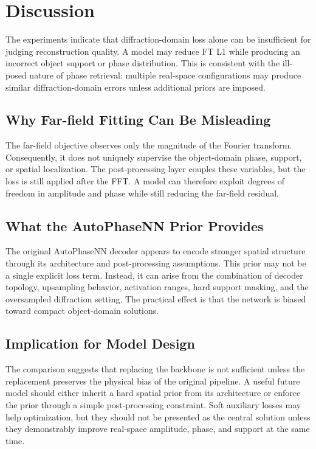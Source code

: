 \section{Discussion}

The experiments indicate that diffraction-domain loss alone can be insufficient
for judging reconstruction quality. A model may reduce FT L1 while producing an
incorrect object support or phase distribution. This is consistent with the
ill-posed nature of phase retrieval: multiple real-space configurations may
produce similar diffraction-domain errors unless additional priors are imposed.

\subsection{Why Far-field Fitting Can Be Misleading}
The far-field objective observes only the magnitude of the Fourier transform.
Consequently, it does not uniquely supervise the object-domain phase, support,
or spatial localization. The post-processing layer couples these variables, but
the loss is still applied after the FFT. A model can therefore exploit degrees
of freedom in amplitude and phase while still reducing the far-field residual.

\subsection{What the AutoPhaseNN Prior Provides}
The original AutoPhaseNN decoder appears to encode stronger spatial structure
through its architecture and post-processing assumptions. This prior may not be
a single explicit loss term. Instead, it can arise from the combination of
decoder topology, upsampling behavior, activation ranges, hard support masking,
and the oversampled diffraction setting. The practical effect is that the
network is biased toward compact object-domain solutions.

\subsection{Implication for Model Design}
The comparison suggests that replacing the backbone is not sufficient unless
the replacement preserves the physical bias of the original pipeline. A useful
future model should either inherit a hard spatial prior from its architecture or
enforce the prior through a simple post-processing constraint. Soft auxiliary
losses may help optimization, but they should not be presented as the central
solution unless they demonstrably improve real-space amplitude, phase, and
support at the same time.

